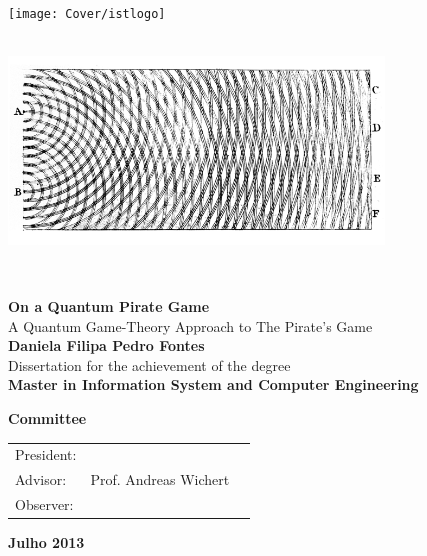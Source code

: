 \setcounter{page}{1} 


\thispagestyle{empty}
\begin{flushleft} ~\\ \vspace{-10mm} \hspace{-9mm}  \texttt{[image: Cover/istlogo]} 
\\ \vspace{5mm}
~\\ \begin{center} \includegraphics[height=50mm]{Figures/Cover/bU-lachas.png}  \end{center} %
~\\ \vspace{5mm}
\begin{centering}
\LARGE \textbf{On a Quantum Pirate Game}
\\ \vspace{5mm}
\Large A Quantum Game-Theory Approach to The Pirate's Game
\\ \vspace{15mm}
\Large \textbf{Daniela Filipa Pedro Fontes}
\\ \vspace{15mm}
\large Dissertation for the achievement of the degree
\\ \vspace{2mm}
\LARGE \textbf{Master in Information System and Computer Engineering}
\\ \vspace{20mm}

\Large \textbf{Committee}
\\ \vspace{7mm}
\begin{tabular}{lcl}
\large President: 	&   & \large \\ 
\large Advisor:   &Prof. Andreas Wichert& \large \\ 
\large Observer:	 				&   & \large \\
\end{tabular}
 
\vspace{7mm}

\Large \textbf{Julho 2013} \\
\end{centering}
\let\thepage\relax
\end{flushleft}
\pagebreak


